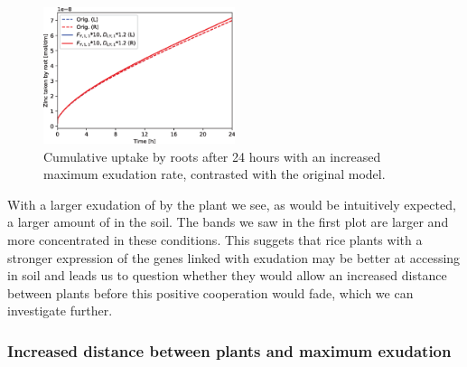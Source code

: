 \documentclass[11pt]{article}
\numberwithin{equation}{section}
\begin{document}
 \begin{figure}[h]
    \centering
    \includegraphics[width=0.5\textwidth]{Figures/testpics/ZnCumulative/IncreasedDMACumuZn.eps}
    \caption{Cumulative  uptake by roots after 24 hours with an increased maximum  exudation rate, contrasted with the original model.}
\end{figure}
 With a larger exudation of  by the plant we see, as would be intuitively expected, a larger amount of  in the soil. The bands we saw in the first plot are larger and more concentrated in these conditions. This suggets that rice plants with a stronger expression of the genes linked with  exudation may be better at accessing  in soil and leads us to question whether they would allow an increased distance between plants before this positive cooperation would fade, which we can investigate further.
 
 
\subsubsection{Increased distance between plants and maximum  exudation}
\end{document}

